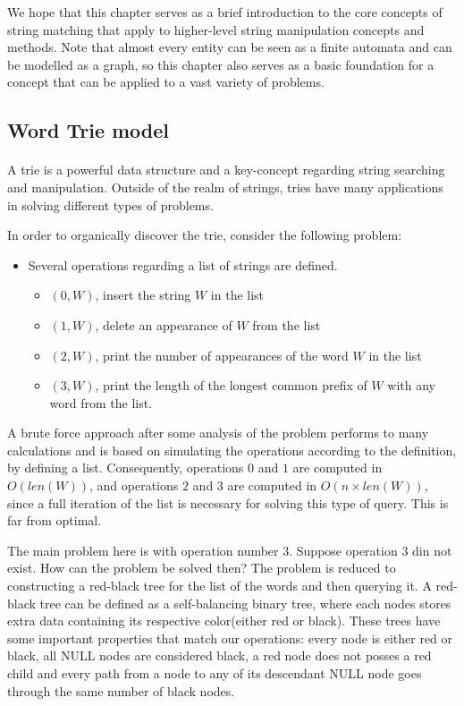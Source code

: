 \documentclass[letterpaper]{article}
\begin{document}
We hope that this chapter serves as a brief introduction to the core concepts of string matching that apply to higher-level string manipulation concepts and methods. Note that almost every entity can be seen as a finite automata and can be modelled as a graph, so this chapter also serves as a basic foundation for a concept that can be applied to a vast variety of problems. 

\newpage

\subsection{Word Trie model}

\paragraph{}

A trie is a powerful data structure and a key-concept regarding string searching and manipulation. Outside of the realm of strings, tries have many applications in solving different types of problems.

In order to organically discover the trie, consider the following problem:

\begin{itemize}
    \item Several operations regarding a list of strings are defined.
    \begin{itemize}
        \item $(0, W)$, insert the string $W$ in the list
        \item $(1, W)$, delete an appearance of $W$ from the list
        \item $(2, W)$, print the number of appearances of the word $W$ in the list
        \item $(3,W)$, print the length of the longest common prefix of $W$ with any word from the list.
    \end{itemize}
\end{itemize}

A brute force approach after some analysis of the problem performs to many calculations and is based on simulating the operations according to the definition, by defining a list. Consequently, operations $0$ and $1$ are computed in $O(len(W))$, and operations $2$ and $3$ are computed in $O(n \times len(W))$, since a full iteration of the list is necessary for solving this type of query. This is far from optimal.

The main problem here is with operation number $3$. Suppose operation $3$ din not exist. How can the problem be solved then? The problem is reduced to constructing a red-black tree for the list of the words and then querying it. A red-black tree can be defined as a self-balancing binary tree, where each nodes stores extra data containing its respective color(either red or black). These trees have some important properties that match our operations: every node is either red or black, all NULL nodes are considered black, a red node does not posses a red child and every path from a node to any of its descendant NULL node goes through the same number of black nodes.
\end{document}
